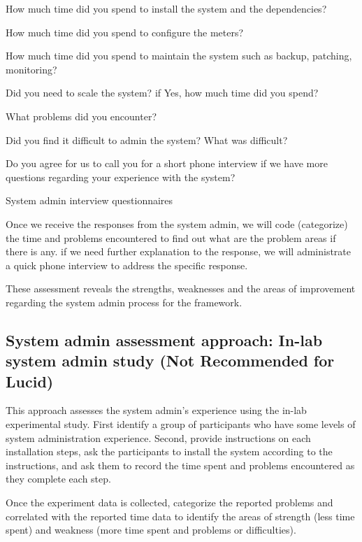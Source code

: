 \documentclass[11pt,oneside]{book}
\begin{document}
\begin{table}[ht!]
\begin{mybox}
\begin{compactenum}
\item How much time did you spend to install the system and the dependencies?
\item How much time did you spend to configure the meters?
\item How much time did you spend to maintain the system such as backup, patching, monitoring?
\item Did you need to scale the system? if Yes, how much time did you spend?
\item What problems did you encounter?
\item Did you find it difficult to admin the system? What was difficult?
\item Do you agree for us to call you for a short phone interview if we have more questions regarding your experience with the system?
\end{compactenum}
\end{mybox}
\caption{System admin interview questionnaires}
\label{fig:system-admin-interview}  
\end{table}

Once we receive the responses from the system admin, we will code (categorize) the time and problems encountered to find out what are the problem areas if there is any. if we need further explanation to the response, we will administrate a quick phone interview to address the specific response. 

These assessment reveals the strengths, weaknesses and the areas of improvement regarding the system admin process for the framework.

\subsection{System admin assessment approach: In-lab system admin study (Not Recommended for Lucid)}
\label{In-lab system admin study}

This approach assesses the system admin's experience using the in-lab experimental study. First identify a group 
of participants who have some levels of system administration experience. Second, provide instructions on 
each installation steps, ask the participants to install the system according to the instructions, and ask them to record 
the time spent and problems encountered as they complete each step.

Once the experiment data is collected, categorize the reported problems and correlated with the reported time data 
to identify the areas of strength (less time spent) and weakness (more time spent and problems or difficulties). 
\end{document}
